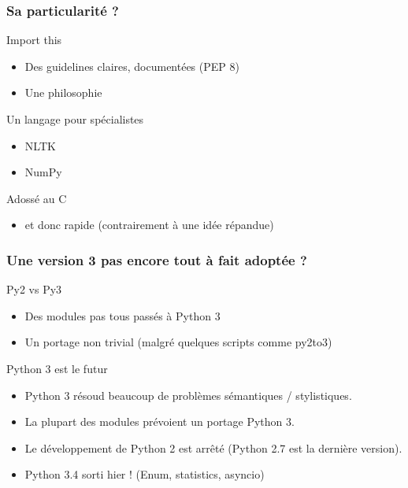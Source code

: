 \documentclass{beamer}
\begin{document}
\begin{frame}
  \frametitle{Sa particularité ?}
  
  \begin{block}{Import this}
    \begin{itemize}
    \item Des guidelines claires, documentées (PEP 8)
    \item Une philosophie
    \end{itemize}
  \end{block}

  \pause

  \begin{block}{Un langage pour spécialistes}
    \begin{itemize}
    \item NLTK
    \item NumPy
    \end{itemize}
  \end{block}

  \pause

  \begin{block}{Adossé au C}
    \begin{itemize}
    \item et donc rapide (contrairement à une idée répandue)
    \end{itemize}
  \end{block}

\end{frame}

\begin{frame}
  \frametitle{Une version 3 pas encore tout à fait adoptée ?}

  \begin{block}{Py2 vs Py3}
    \begin{itemize}
    \item Des modules pas tous passés à Python 3
    \item Un portage non trivial (malgré quelques scripts comme py2to3)
    \end{itemize}
  \end{block}

  \pause

  \begin{block}{Python 3 est le futur}
    \begin{itemize}
    \item Python 3 résoud beaucoup de problèmes sémantiques / stylistiques.
    \item La plupart des modules prévoient un portage Python 3.
    \item Le développement de Python 2 est arrêté (Python 2.7 est la
      dernière version).
    \item Python 3.4 sorti hier ! (Enum, statistics, asyncio)
    \end{itemize}
  \end{block}
\end{frame}
\end{document}
